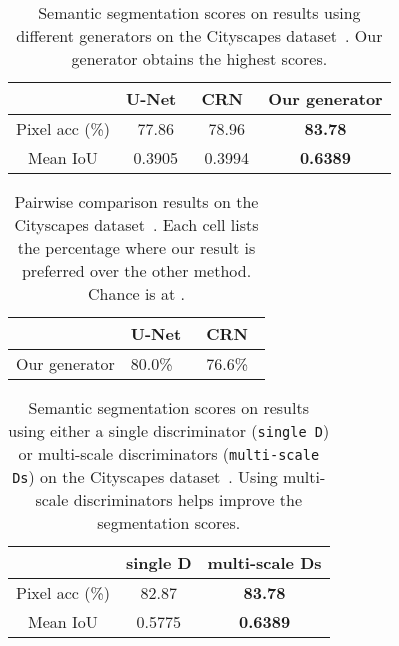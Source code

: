 \documentclass[10pt,twocolumn,letterpaper]{article}
\newcommand{\lbltbl}[1]{\label{tbl:#1}}
\begin{document}
\begin{table}[t!]
\vspace{-.2in}
\centering
\begin{tabular}{  c  c  c  c  }
\toprule
\multicolumn{1}{c}{}
 & U-Net~\cite{ronneberger2015u,isola2016image} & CRN~\cite{chen2017photographic} & Our generator \\ \midrule 
Pixel acc (\%) & 77.86 &  78.96  &  {\bf 83.78} \\
Mean IoU & 0.3905  &  0.3994  &  {\bf 0.6389} \\ \bottomrule 
\end{tabular}
\caption{Semantic segmentation scores on results using different generators on the Cityscapes dataset~\cite{Cordts2016cityscapes}. Our generator obtains the highest scores.}
\lbltbl{seg_G}
\end{table}

\begin{table}[t!]
\setlength{\tabcolsep}{2pt}
\centering
\begin{tabularx}{0.45\textwidth}{c *{2}{Y}} \toprule
& U-Net~\cite{ronneberger2015u,isola2016image} & CRN~\cite{chen2017photographic}   \\ \midrule
Our generator & 80.0\% & 76.6\%  \\ 
\bottomrule 
\end{tabularx}
\caption{Pairwise comparison results on the Cityscapes dataset~\cite{Cordts2016cityscapes}. Each cell lists the percentage where our result is preferred over the other method. Chance is at .}
\lbltbl{unlimited_G}
\end{table}

\begin{table}[h!]
\vspace{-.1in}
\centering
\begin{tabularx}{0.38\textwidth}{  c  c  c  }
\toprule
\multicolumn{1}{c}{}
 & single D & multi-scale Ds \\ \midrule 
Pixel acc (\%) & 82.87 &  {\bf 83.78} \\ 
Mean IoU & 0.5775 &  {\bf 0.6389} \\ \bottomrule 
\end{tabularx}
\caption{Semantic segmentation scores on results using either a single discriminator (\texttt{single D}) or multi-scale discriminators (\texttt{multi-scale Ds}) on the Cityscapes dataset~\cite{Cordts2016cityscapes}. Using multi-scale discriminators helps improve the segmentation scores.}
\lbltbl{seg_D}
\end{table}
\end{document}
